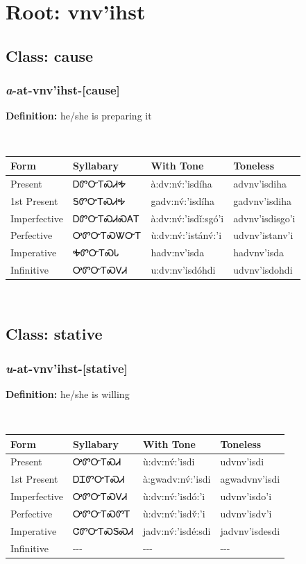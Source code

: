 \needspace{4in}
\section*{Root: vnv'ihst}
\nopagebreak
{}
\needspace{3in}
\subsection*{Class: cause}
\nopagebreak
\needspace{2in}
\subsubsection*{\textit{a}{-}at{-}\textbf{vnv'ihst}{-}[cause]}
\nopagebreak
\textbf{Definition: } he/she is preparing it
\\[0.5em]
\begin{tabularx}{\textwidth}{l X X X}%
\toprule%
\textbf{Form}&\textbf{Syllabary}&\textbf{With Tone}&\textbf{Toneless}\\%
\midrule%
Present&ᎠᏛᏅᎢᏍᏗᎭ&à:dv:nv́:’isdíha&advnv’isdiha\\%
1st Present&ᎦᏛᏅᎢᏍᏗᎭ&gadv:nv́:’isdíha&gadvnv’isdiha\\%
Imperfective&ᎠᏛᏅᎢᏍᏗᏍᎪᎢ&à:dv:nv́:’isdǐ:sgó’i&advnv’isdisgo’i\\%
Perfective&ᎤᏛᏅᎢᏍᏔᏅᎢ&ù:dv:nv́:’istánv́:’i&udvnv’istanv’i\\%
Imperative&ᎭᏛᏅᎢᏍᏓ&hadv:nv’isda&hadvnv’isda\\%
Infinitive&ᎤᏛᏅᎢᏍᏙᏗ&u:dv:nv’isdóhdi&udvnv’isdohdi\\%
\bottomrule%
\end{tabularx}
\\[1em]
\needspace{3in}
\subsection*{Class: stative}
\nopagebreak
\needspace{2in}
\subsubsection*{\textit{u}{-}at{-}\textbf{vnv'ihst}{-}[stative]}
\nopagebreak
\textbf{Definition: } he/she is willing
\\[0.5em]
\begin{tabularx}{\textwidth}{l X X X}%
\toprule%
\textbf{Form}&\textbf{Syllabary}&\textbf{With Tone}&\textbf{Toneless}\\%
\midrule%
Present&ᎤᏛᏅᎢᏍᏗ&ù:dv:nv́:’isdi&udvnv’isdi\\%
1st Present&ᎠᏆᏛᏅᎢᏍᏗ&à:gwadv:nv́:’isdi&agwadvnv’isdi\\%
Imperfective&ᎤᏛᏅᎢᏍᏙᏗ&ù:dv:nv́:’isdó:’i&udvnv’isdo’i\\%
Perfective&ᎤᏛᏅᎢᏍᏛᎢ&ù:dv:nv́:’isdv̌:’i&udvnv’isdv’i\\%
Imperative&ᏣᏛᏅᎢᏍᏕᏍᏗ&jadv:nv́:’isdé:sdi&jadvnv’isdesdi\\%
Infinitive&{-}{-}{-}&{-}{-}{-}&{-}{-}{-}\\%
\bottomrule%
\end{tabularx}
\\[1em]